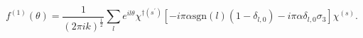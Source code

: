 \begin{equation}
f^{\left( 1\right) }(\theta )=\frac{1}{\left(2\pi ik\right) ^{\frac{1}{2}}}
\sum_{l}^{{}}e^{il\theta }\chi^{\dagger\left( s^{\prime }\right) }
\left[  -i\pi \alpha \mathrm{sgn}\left(l\right)
\left( 1-\delta _{l,0}\right) -i\pi \alpha \delta _{l,0}\sigma _{3} \right]
\chi ^{\left( s\right) }.
\end{equation}

